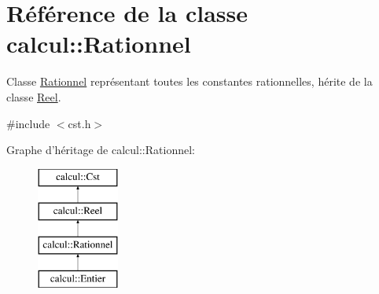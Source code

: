 \hypertarget{classcalcul_1_1_rationnel}{\section{Référence de la classe calcul\-:\-:Rationnel}
\label{classcalcul_1_1_rationnel}
}


Classe \hyperlink{classcalcul_1_1_rationnel}{Rationnel} représentant toutes les constantes rationnelles, hérite de la classe \hyperlink{classcalcul_1_1_reel}{Reel}.  




{\ttfamily \#include $<$cst.\-h$>$}

Graphe d'héritage de calcul\-:\-:Rationnel\-:\begin{figure}[H]
\begin{center}
\leavevmode
\includegraphics[height=4.000000cm]{classcalcul_1_1_rationnel}
\end{center}
\end{figure}
